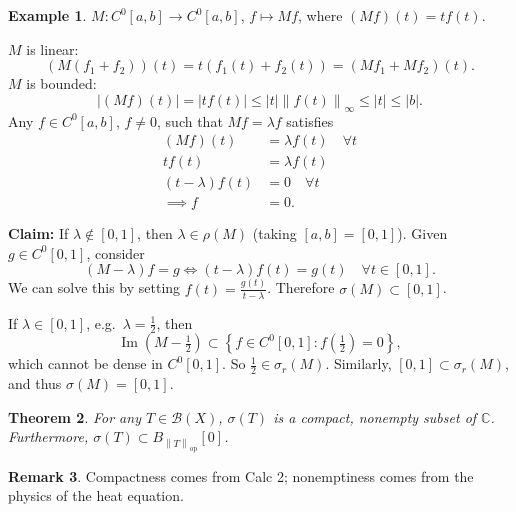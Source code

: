 \documentclass[12pt]{article}
\renewcommand{\Im}{\operatorname{Im}}
\newcommand{\abs}[1]{\left| #1 \right|}
\newcommand{\norm}[1]{\left\| #1 \right\|}
\newcommand{\C}{\mathbb{C}}
\newcommand{\cB}{\mathcal{B}}
\newtheorem{thm}{Theorem}[section]
\theoremstyle{definition}
\newtheorem{ex}[thm]{Example}
\newtheorem{rmk}[thm]{Remark}
\begin{document}
\begin{ex}
	$M : C^0[a,b] \to C^0[a,b]$, $f \mapsto Mf$, where $(Mf)(t) = t f(t)$.

	$M$ is linear:
	\begin{equation*}
		(M(f_1 + f_2))(t) = t(f_1(t) + f_2(t)) = (Mf_1 + Mf_2)(t).
	\end{equation*}
	$M$ is bounded:
	\begin{equation*}
		\abs{(Mf)(t)} = \abs{t f(t)} \leq \abs{t} \norm{f(t)}_\infty \leq \abs{t} \leq \abs{b}.
	\end{equation*}
	Any $f \in C^0[a,b]$, $f \neq 0$, such that $Mf = \lambda f$ satisfies
	\begin{align*}
		(Mf)(t) &= \lambda f(t) \quad \forall t \\
		t f(t) &= \lambda f(t) \\
		(t - \lambda) f(t) &= 0 \quad \forall t \\
		\implies f &= 0.
	\end{align*}

	\textbf{Claim: } If $\lambda \notin [0,1]$, then $\lambda \in \rho(M)$ (taking $[a,b] = [0,1]$).
	Given $g \in C^0[0,1]$, consider
	\begin{equation*}
		(M - \lambda) f = g \iff (t-\lambda) f(t) = g(t) \quad \forall t \in [0,1].
	\end{equation*}
	We can solve this by setting $f(t) = \frac{g(t)}{t - \lambda}$.
	Therefore $\sigma(M) \subset [0,1]$.

	If $\lambda \in [0,1]$, e.g.\ $\lambda = \frac{1}{2}$, then
	\begin{equation*}
		\Im\left( M - \tfrac{1}{2} \right) \subset \left\lbrace f \in C^0[0,1] : f\left( \tfrac{1}{2} \right) = 0 \right\rbrace,
	\end{equation*}
	which cannot be dense in $C^0[0,1]$.
	So $\frac{1}{2} \in \sigma_r(M)$.
	Similarly, $[0,1] \subset \sigma_r(M)$, and thus $\sigma(M) = [0,1]$.
\end{ex}

\begin{thm}
	For any $T \in \cB(X)$, $\sigma(T)$ is a compact, nonempty subset of $\C$.
	Furthermore, $\sigma(T) \subset B_{\norm{T}_{\mathrm{op}}}[0]$.
\end{thm}

\begin{rmk}
	Compactness comes from Calc 2; nonemptiness comes from the physics of the heat equation.
\end{rmk}
\end{document}
